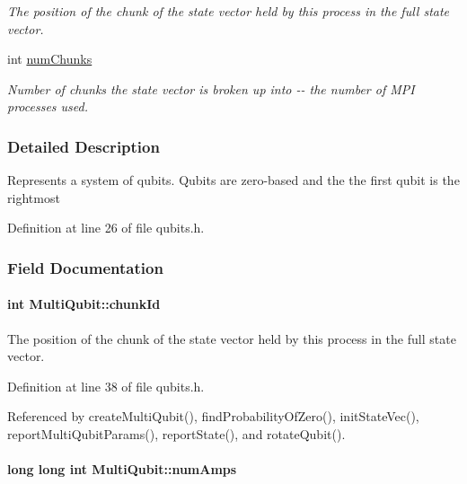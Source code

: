 \begin{DoxyCompactItemize}
\begin{DoxyCompactList}\small\item\em The position of the chunk of the state vector held by this process in the full state vector. \item\end{DoxyCompactList}\item 
int \hyperlink{structMultiQubit_acd43f2f57991709c9e94f73662c972b2}{numChunks}
\begin{DoxyCompactList}\small\item\em Number of chunks the state vector is broken up into -\/-\/ the number of MPI processes used. \item\end{DoxyCompactList}\end{DoxyCompactItemize}


\subsubsection{Detailed Description}
Represents a system of qubits. Qubits are zero-\/based and the the first qubit is the rightmost 

Definition at line 26 of file qubits.h.

\subsubsection{Field Documentation}
\hypertarget{structMultiQubit_ab10c88249fa3825d6227ceec01d37e37}{
\paragraph[{chunkId}]{\setlength{\rightskip}{0pt plus 5cm}int {\bf MultiQubit::chunkId}}\hfill}
\label{structMultiQubit_ab10c88249fa3825d6227ceec01d37e37}


The position of the chunk of the state vector held by this process in the full state vector. 

Definition at line 38 of file qubits.h.

Referenced by createMultiQubit(), findProbabilityOfZero(), initStateVec(), reportMultiQubitParams(), reportState(), and rotateQubit().\hypertarget{structMultiQubit_ae16f47d8b725c914fb7f66b6498d79db}{
\paragraph[{numAmps}]{\setlength{\rightskip}{0pt plus 5cm}long long int {\bf MultiQubit::numAmps}}\hfill}
\label{structMultiQubit_ae16f47d8b725c914fb7f66b6498d79db}



